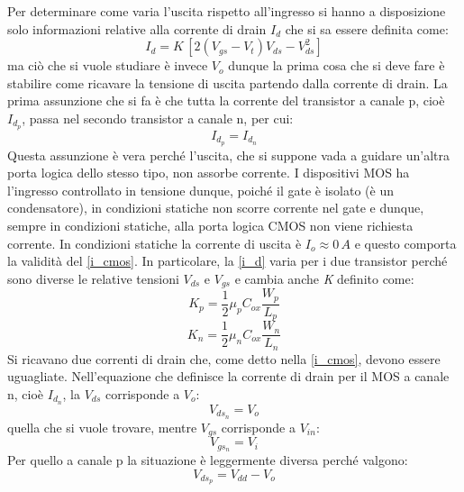 \documentclass[12pt, a4paper]{report}
\begin{document}
Per determinare come varia l'uscita rispetto all'ingresso si hanno a disposizione solo informazioni relative alla corrente di drain $I_{d}$ che si sa essere definita come:
\begin{equation}
    I_{d} = K\,[2(V_{gs} - V_{t})V_{ds} - V_{ds}^2]
    \label{i_d}
\end{equation}
ma ciò che si vuole studiare è invece $V_{o}$ dunque la prima cosa che si deve fare è stabilire come ricavare la tensione di uscita partendo dalla corrente di drain. La prima assunzione che si fa è che tutta la corrente del transistor a canale p, cioè $I_{d_{p}}$, passa nel secondo transistor a canale n, per cui:
\begin{equation}
    I_{d_{p}} = I_{d_{n}}
    \label{i_cmos}
\end{equation}
Questa assunzione è vera perché l'uscita, che si suppone vada a guidare un'altra porta logica dello stesso tipo, non assorbe corrente. I dispositivi MOS ha l'ingresso controllato in tensione dunque, poiché il gate è isolato (è un condensatore), in condizioni statiche non scorre corrente nel gate e dunque, sempre in condizioni statiche, alla porta logica CMOS non viene richiesta corrente. In condizioni statiche la corrente di uscita è $I_{o} \approx 0\,A$ e questo comporta la validità del \eqref{i_cmos}. In particolare, la \eqref{i_d} varia per i due transistor perché sono diverse le relative tensioni $V_{ds}$ e $V_{gs}$ e cambia anche \textit{K} definito come:
\begin{equation*}
    K_{p} = \frac{1}{2}\mu_{p} C_{ox}\frac{W_p}{L_p}
\end{equation*}
\begin{equation*}
    K_{n} = \frac{1}{2}\mu_{n} C_{ox}\frac{W_n}{L_n}
\end{equation*}
Si ricavano due correnti di drain che, come detto nella \eqref{i_cmos}, devono essere uguagliate. Nell'equazione che definisce la corrente di drain per il MOS a canale n, cioè $I_{d_{n}}$, la $V_{ds}$ corrisponde a $V_{o}$:
\begin{equation}
    V_{ds_{n}} = V_{o}
\end{equation}
quella che si vuole trovare, mentre $V_{gs}$ corrisponde a $V_{in}$: 
\begin{equation}
    V_{gs_{n}} = V_{i}
\end{equation}
Per quello a canale p la situazione è leggermente diversa perché valgono:
\begin{equation}
    V_{ds_{p}} = V_{dd} - V_{o}
\end{equation}
\end{document}
